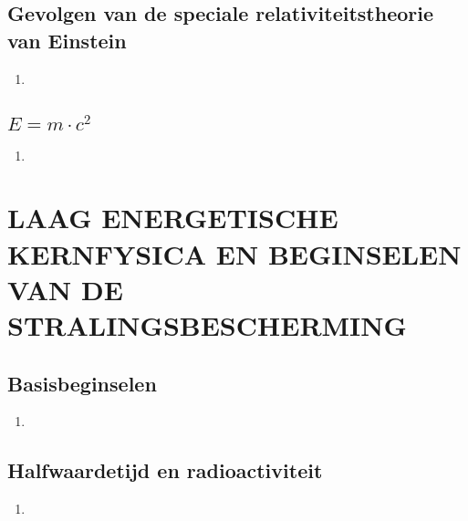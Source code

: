 \documentclass[12pt]{article}
\begin{document}
    \subsection{Gevolgen van de speciale relativiteitstheorie van Einstein}
    \begin{enumerate}
        \item 
    \end{enumerate}
    \subsection{$E=m \cdot c^2$}
    \begin{enumerate}
        \item 
    \end{enumerate}



    \section{LAAG ENERGETISCHE KERNFYSICA EN BEGINSELEN VAN DE STRALINGSBESCHERMING}
    \subsection{Basisbeginselen}
    \begin{enumerate}
        \item 
    \end{enumerate}
    \subsection{Halfwaardetijd en radioactiviteit}
    \begin{enumerate}
        \item 
    \end{enumerate}
\end{document}
